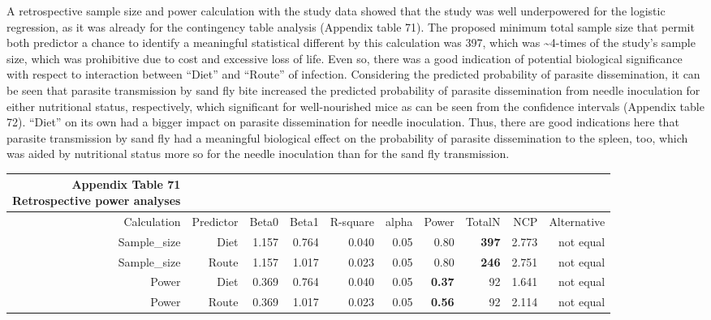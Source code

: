 \documentclass[
  12pt,
  letterpaper,
]{article}
\begin{document}
A retrospective sample size and power calculation with the study data showed that the study was well underpowered for the logistic regression, as it was already for the contingency table analysis (Appendix table 71). The proposed minimum total sample size that permit both predictor a chance to identify a meaningful statistical different by this calculation was 397, which was \textasciitilde4-times of the study's sample size, which was prohibitive due to cost and excessive loss of life. Even so, there was a good indication of potential biological significance with respect to interaction between ``Diet'' and ``Route'' of infection. Considering the predicted probability of parasite dissemination, it can be seen that parasite transmission by sand fly bite increased the predicted probability of parasite dissemination from needle inoculation for either nutritional status, respectively, which significant for well-nourished mice as can be seen from the confidence intervals (Appendix table 72). ``Diet'' on its own had a bigger impact on parasite dissemination for needle inoculation. Thus, there are good indications here that parasite transmission by sand fly had a meaningful biological effect on the probability of parasite dissemination to the spleen, too, which was aided by nutritional status more so for the needle inoculation than for the sand fly transmission.

\begingroup
\fontsize{12.0pt}{14.4pt}\selectfont
\begin{longtable}{rrrrrrrrrr}
\caption*{
{\large \textbf{Appendix Table 71}} \\ 
{\small \textbf{Retrospective power analyses}}
} \\ 
\toprule
{Calculation} & {Predictor} & {Beta0} & {Beta1} & {R-square} & {alpha} & {Power} & {TotalN} & {NCP} & {Alternative} \\ 
\midrule\addlinespace[2.5pt]
Sample\_size & Diet & 1.157 & 0.764 & 0.040 & 0.05 & 0.80 & {\bfseries 397} & 2.773 & not equal \\ 
Sample\_size & Route & 1.157 & 1.017 & 0.023 & 0.05 & 0.80 & {\bfseries 246} & 2.751 & not equal \\ 
Power & Diet & 0.369 & 0.764 & 0.040 & 0.05 & {\bfseries 0.37} & 92 & 1.641 & not equal \\ 
Power & Route & 0.369 & 1.017 & 0.023 & 0.05 & {\bfseries 0.56} & 92 & 2.114 & not equal \\ 
\bottomrule
\end{longtable}
\endgroup
\end{document}
